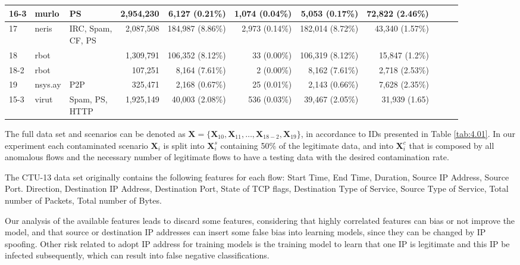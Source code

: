 \begin{table}[h!]
\begin{tabular}{| l | l | l | r | r | r | r | r | r | r | r | }
			16-3 & murlo &PS & 2,954,230 & 6,127 (0.21\%) & 1,074 (0.04\%) & 5,053 (0.17\%) &72,822 (2.46\%)\\ \hline
			17 & neris &\makecell[l]{IRC, Spam,\\CF, PS} & 2,087,508 & 184,987 (8.86\%) & 2,973 (0.14\%) & 182,014 (8.72\%) &43,340 (1.57\%)\\ \hline
			18 & rbot &\makecell[l]{IRC, DDoS} & 1,309,791 & 106,352 (8.12\%) & 33 (0.00\%) & 106,319 (8.12\%) &15,847 (1.2\%)\\ \hline
			18-2 & rbot &\makecell[l]{IRC, DDoS} & 107,251 & 8,164 (7.61\%) & 2 (0.00\%) & 8,162 (7.61\%) &2,718 (2.53\%)\\ \hline
			19 & nsys.ay &P2P & 325,471 & 2,168 (0.67\%) & 25 (0.01\%) & 2,143 (0.66\%) &7,628 (2.35\%)\\ \hline
			15-3 & virut &\makecell[l]{Spam, PS,\\HTTP} & 1,925,149 & 40,003 (2.08\%) & 536 (0.03\%) & 39,467 (2.05\%) &31,939 (1.65)\\ \hline
	\end{tabular}
\end{table}

The full data set and scenarios can be denoted as $\pmb{X} = \{\pmb{X}_{10}, \pmb{X}_{11}, \ldots , \pmb{X}_{18-2}, \pmb{X}_{19}\}$, in accordance to IDs presented in Table \ref{tab:4.01}. In our experiment each contaminated scenario $\pmb{X}_i$ is split into $\pmb{X}_i^s$ containing 50\% of the legitimate data, and into $\pmb{X}_i^c$ that is composed by all anomalous flows and the necessary number of legitimate flows to have a testing data with the desired contamination rate.

The CTU-13 data set originally contains the following features for each flow: Start Time, End Time, Duration, Source IP Address, Source Port. Direction, Destination IP Address, Destination Port, State of TCP flags, Destination Type of Service, Source Type of Service, Total number of Packets, Total number of Bytes.

Our analysis of the available features leads to discard some features, considering that highly correlated features can bias or not improve the model, and that source or destination IP addresses can insert some false bias into learning models, since they can be changed by IP spoofing. Other risk related to adopt IP address for training models is the training model to learn that
one IP is legitimate and this IP be infected subsequently, which can result into false negative classifications.

